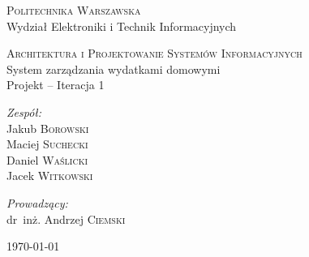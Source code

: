 \documentclass[parindent=0pt,11pt,a4paper]{article}
\begin{document}
\begin{titlepage}
  \begin{center}

    \textsc{\Large Politechnika Warszawska}\\[0.1cm]
    \small Wydział Elektroniki i Technik Informacyjnych
    \vfill

    \textsc{\small Architektura i Projektowanie Systemów Informacyjnych}\\[0.1cm]
    \Huge System zarządzania wydatkami domowymi\\[1.5cm]
    \small Projekt -- Iteracja 1\\[2.5cm]

    \vfill

    \begin{minipage}{0.4\textwidth}
      \begin{flushleft} \large
        \emph{Zespół:}\\[0.1cm]
        Jakub \textsc{Borowski}\\
        Maciej \textsc{Suchecki}\\
        Daniel \textsc{Waślicki}\\
        Jacek \textsc{Witkowski}\\
      \end{flushleft}
    \end{minipage}
    \begin{minipage}{0.4\textwidth}
      \begin{flushright} \large
        \emph{Prowadzący:}\\[0.1cm]
        dr~inż. Andrzej \textsc{Ciemski}\\[1cm]
      \end{flushright}
    \end{minipage}

    \vfill
    {\large \today}

  \end{center}
\end{titlepage}

\newpage
\tableofcontents

\newpage

\newpage

\newpage

%
%
%
\end{document}
